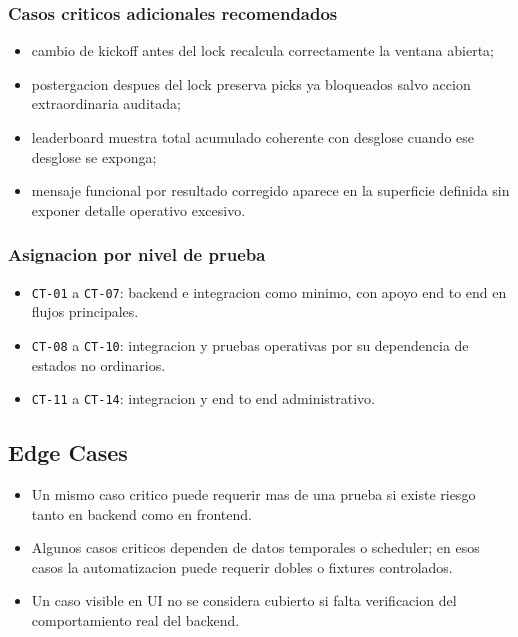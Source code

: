 \subsubsection{Casos criticos adicionales recomendados}

\begin{itemize}
  \item cambio de kickoff antes del lock recalcula correctamente la ventana abierta;
  \item postergacion despues del lock preserva picks ya bloqueados salvo accion extraordinaria auditada;
  \item leaderboard muestra total acumulado coherente con desglose cuando ese desglose se exponga;
  \item mensaje funcional por resultado corregido aparece en la superficie definida sin exponer detalle operativo excesivo.
\end{itemize}

\subsubsection{Asignacion por nivel de prueba}

\begin{itemize}
  \item \texttt{CT-01} a \texttt{CT-07}: backend e integracion como minimo, con apoyo end to end en flujos principales.
  \item \texttt{CT-08} a \texttt{CT-10}: integracion y pruebas operativas por su dependencia de estados no ordinarios.
  \item \texttt{CT-11} a \texttt{CT-14}: integracion y end to end administrativo.
\end{itemize}

\subsection{Edge Cases}

\begin{itemize}
  \item Un mismo caso critico puede requerir mas de una prueba si existe riesgo tanto en backend como en frontend.
  \item Algunos casos criticos dependen de datos temporales o scheduler; en esos casos la automatizacion puede requerir dobles o fixtures controlados.
  \item Un caso visible en UI no se considera cubierto si falta verificacion del comportamiento real del backend.
\end{itemize}

